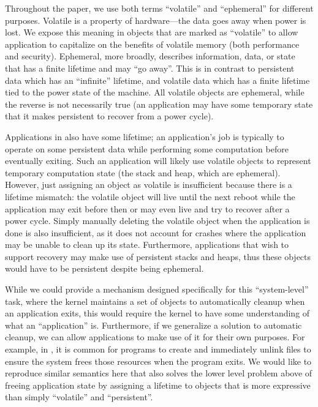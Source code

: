     Throughout the paper, we use both terms ``volatile'' and ``ephemeral'' for different purposes.
    Volatile is a property of hardware---the data goes away when power is lost. We expose this meaning
    in objects that are marked as ``volatile'' to allow application to capitalize on the benefits of
    volatile memory (both performance and security). Ephemeral, more broadly, describes information,
    data, or state that has a finite lifetime and may ``go away''. This is in contrast to persistent
    data which has an ``infinite'' lifetime, and volatile data which has a finite lifetime tied to the
    power state of the machine. All volatile objects are ephemeral, while the reverse is not necessarily
    true (\eg an application may have some temporary state that it makes persistent to recover from a
    power cycle).
\fi

Applications in \Twizzler also have some lifetime; an application's job is typically to operate on
some persistent data while performing some computation before eventually exiting. Such an
application will likely use volatile objects to represent temporary computation state (\eg the
stack and heap, which are ephemeral). However, just assigning an object as volatile is insufficient
because there is a lifetime mismatch: the volatile object will live until the next reboot while the
application may exit before then or may even live and try to recover after a power cycle. Simply
manually deleting the volatile object when the application is done is also insufficient, as it does
not account for crashes where the application may be unable to clean up its state. Furthermore,
applications that wish to support recovery may make use of persistent stacks and heaps, thus these
objects would have to be persistent despite being ephemeral.

While we could provide a mechanism designed specifically for this ``system-level'' task,
where the kernel maintains a set of objects to automatically cleanup when an application exits, this
would require the kernel to have some understanding of what an ``application'' is. Furthermore, if
we generalize a solution to automatic cleanup, we can allow applications to make use of it for their
own purposes. For example, in \unix, it is common for programs to create and immediately unlink
files to ensure the system frees those resources when the program exits. We would like to reproduce
similar semantics here that also solves the lower level problem above of freeing application state
by assigning a lifetime to objects that is more expressive than simply ``volatile'' and
``persistent''.

